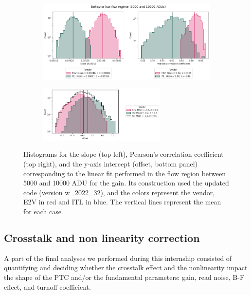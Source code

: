 \begin{figure}[!htb]
     \centering
     \begin{subfigure}[b]{\textwidth}
         \centering
         \includegraphics[width=\textwidth]{Figures/Histogram_slope_corr_new.png}
     \end{subfigure}
     \vspace{3mm}
     \begin{subfigure}[b]{\textwidth}
         \centering
         \includegraphics[width=0.7\textwidth]{Figures/Histogram_offset_new.png}
     \end{subfigure}
        \caption{Histograms for the slope (top left), Pearson's correlation coefficient (top right), and the y-axis intercept (offset, bottom panel) corresponding to the linear fit performed in the flow region between 5000 and 10000 ADU for the gain. Its construction used the updated code (version w\_2022\_32), and the colors represent the vendor, E2V in red and ITL in blue. The vertical lines represent the mean for each case.  }
        \label{fig:histogram_linearfit}
\end{figure}

\subsection{Crosstalk and non linearity correction} \label{subsec:crosstalk_and_linearity}

A part of the final analyses we performed during this internship consisted of quantifying and deciding whether the crosstalk effect and the nonlinearity impact the shape of the PTC and/or the fundamental parameters: gain, read noise, B-F effect, and turnoff coefficient.

